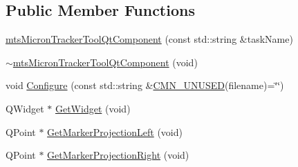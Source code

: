 \subsection*{Public Member Functions}
\begin{DoxyCompactItemize}
\item 
\hyperlink{classmts_micron_tracker_tool_qt_component_a69790b339315aa435a014712a8787d9e}{mts\-Micron\-Tracker\-Tool\-Qt\-Component} (const std\-::string \&task\-Name)
\item 
\hyperlink{classmts_micron_tracker_tool_qt_component_ad4146b1a0bbc819a136033184efaf0ff}{$\sim$mts\-Micron\-Tracker\-Tool\-Qt\-Component} (void)
\item 
void \hyperlink{classmts_micron_tracker_tool_qt_component_abe3134769529de5c477d42c085a3cc16}{Configure} (const std\-::string \&\hyperlink{cmn_portability_8h_a021894e2626935fa2305434b1e893ff6}{C\-M\-N\-\_\-\-U\-N\-U\-S\-E\-D}(filename)=\char`\"{}\char`\"{})
\item 
Q\-Widget $\ast$ \hyperlink{classmts_micron_tracker_tool_qt_component_a7626da8e9ee15cd6a3a0a7eb3f8b7720}{Get\-Widget} (void)
\item 
Q\-Point $\ast$ \hyperlink{classmts_micron_tracker_tool_qt_component_af2f02f25f64e575c479b72ccf719ef7e}{Get\-Marker\-Projection\-Left} (void)
\item 
Q\-Point $\ast$ \hyperlink{classmts_micron_tracker_tool_qt_component_a0d4e2a76d21e7f14919b7d51b19306c4}{Get\-Marker\-Projection\-Right} (void)
\end{DoxyCompactItemize}
